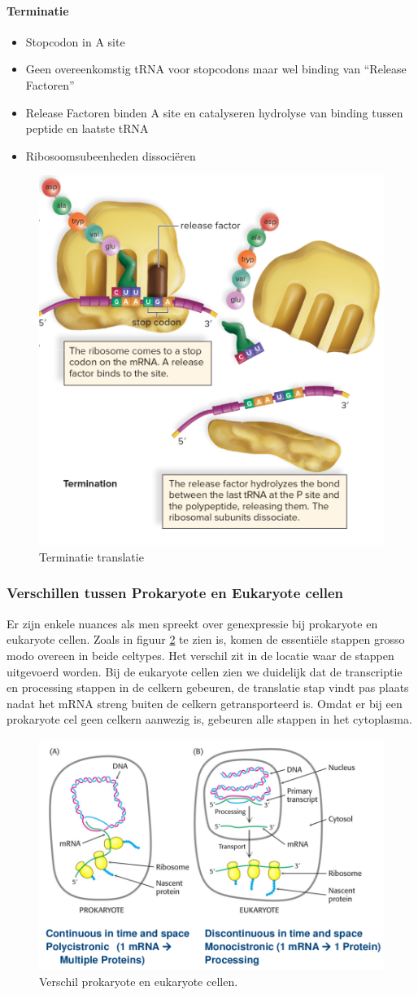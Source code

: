 \documentclass[a4paper,kul]{kulakarticle} %
\begin{document}
\paragraph{Terminatie}
\begin{itemize}
	\item Stopcodon in A site
	\item Geen overeenkomstig tRNA voor stopcodons maar wel binding van “Release Factoren”
	\item Release Factoren binden A site en catalyseren hydrolyse van binding tussen peptide en laatste tRNA
	\item Ribosoomsubeenheden dissociëren
\end{itemize}
\begin{figure}[!h]
	\centering
	\includegraphics[width=0.4\linewidth]{TranslatieTerminatie}
	\caption[Terminatie translatie]{Terminatie translatie}
	\label{fig:translatieterminatie}
\end{figure}
\subsubsection{Verschillen tussen Prokaryote en Eukaryote cellen}
Er zijn enkele nuances als men spreekt over genexpressie bij prokaryote en eukaryote cellen. Zoals in figuur \ref{fig:verschileukarprokar} te zien is, komen de essentiële stappen grosso modo overeen in beide celtypes. Het verschil zit in de locatie waar de stappen uitgevoerd worden. Bij de eukaryote cellen zien we duidelijk dat de transcriptie en processing stappen in de celkern gebeuren, de translatie stap vindt pas plaats nadat het mRNA streng buiten de celkern getransporteerd is. Omdat er bij een prokaryote cel geen celkern aanwezig is, gebeuren alle stappen in het cytoplasma.
\begin{figure}[h]
	\centering
	\includegraphics[width=0.5\linewidth]{VerschilEukarProkar}
	\caption[Verschil prokaryote en eukaryote]{Verschil prokaryote en eukaryote cellen.}
	\label{fig:verschileukarprokar}
\end{figure}
\end{document}
